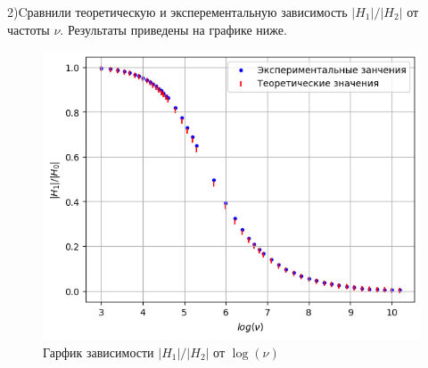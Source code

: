2)Cравнили теоретическую и эксперементальную зависимость $|H_1|/|H_2|$ от частоты $\nu$. Результаты приведены на графике ниже.

\begin{figure}[h!]
    \centering
    \includegraphics[width=12cm]{images/plot6.png}
    \caption{Гарфик зависимости $|H_1| / |H_2|$ от $\log(\nu)$}
\end{figure}


